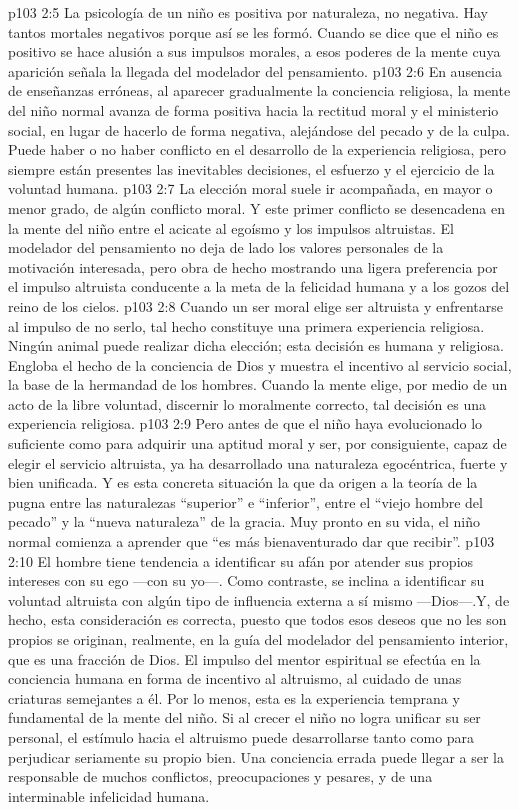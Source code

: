 \vs p103 2:5 La psicología de un niño es positiva por naturaleza, no negativa. Hay tantos mortales negativos porque así se les formó. Cuando se dice que el niño es positivo se hace alusión a sus impulsos morales, a esos poderes de la mente cuya aparición señala la llegada del modelador del pensamiento.
\vs p103 2:6 En ausencia de enseñanzas erróneas, al aparecer gradualmente la conciencia religiosa, la mente del niño normal avanza de forma positiva hacia la rectitud moral y el ministerio social, en lugar de hacerlo de forma negativa, alejándose del pecado y de la culpa. Puede haber o no haber conflicto en el desarrollo de la experiencia religiosa, pero siempre están presentes las inevitables decisiones, el esfuerzo y el ejercicio de la voluntad humana.
\vs p103 2:7 La elección moral suele ir acompañada, en mayor o menor grado, de algún conflicto moral. Y este primer conflicto se desencadena en la mente del niño entre el acicate al egoísmo y los impulsos altruistas. El modelador del pensamiento no deja de lado los valores personales de la motivación interesada, pero obra de hecho mostrando una ligera preferencia por el impulso altruista conducente a la meta de la felicidad humana y a los gozos del reino de los cielos.
\vs p103 2:8 Cuando un ser moral elige ser altruista y enfrentarse al impulso de no serlo, tal hecho constituye una primera experiencia religiosa. Ningún animal puede realizar dicha elección; esta decisión es humana y religiosa. Engloba el hecho de la conciencia de Dios y muestra el incentivo al servicio social, la base de la hermandad de los hombres. Cuando la mente elige, por medio de un acto de la libre voluntad, discernir lo moralmente correcto, tal decisión es una experiencia religiosa.
\vs p103 2:9 Pero antes de que el niño haya evolucionado lo suficiente como para adquirir una aptitud moral y ser, por consiguiente, capaz de elegir el servicio altruista, ya ha desarrollado una naturaleza egocéntrica, fuerte y bien unificada. Y es esta concreta situación la que da origen a la teoría de la pugna entre las naturalezas “superior” e “inferior”, entre el “viejo hombre del pecado” y la “nueva naturaleza” de la gracia. Muy pronto en su vida, el niño normal comienza a aprender que “es más bienaventurado dar que recibir”.
\vs p103 2:10 El hombre tiene tendencia a identificar su afán por atender sus propios intereses con su ego ---con su yo---. Como contraste, se inclina a identificar su voluntad altruista con algún tipo de influencia externa a sí mismo ---Dios---.Y, de hecho, esta consideración es correcta, puesto que todos esos deseos que no les son propios se originan, realmente, en la guía del modelador del pensamiento interior, que es una fracción de Dios. El impulso del mentor espiritual se efectúa en la conciencia humana en forma de incentivo al altruismo, al cuidado de unas criaturas semejantes a él. Por lo menos, esta es la experiencia temprana y fundamental de la mente del niño. Si al crecer el niño no logra unificar su ser personal, el estímulo hacia el altruismo puede desarrollarse tanto como para perjudicar seriamente su propio bien. Una conciencia errada puede llegar a ser la responsable de muchos conflictos, preocupaciones y pesares, y de una interminable infelicidad humana.
